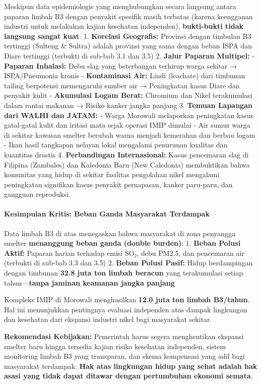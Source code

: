 \documentclass[
]{article}
\begin{document}
Meskipun data epidemiologis yang menghubungkan secara langsung antara
paparan limbah B3 dengan penyakit spesifik masih terbatas (karena
keengganan industri untuk melakukan kajian kesehatan independen),
\textbf{bukti-bukti tidak langsung sangat kuat}: 1. \textbf{Korelasi
Geografis:} Provinsi dengan timbulan B3 tertinggi (Sulteng \& Sultra)
adalah provinsi yang sama dengan beban ISPA dan Diare tertinggi
(terbukti di sub-bab 3.1 dan 3.5) 2. \textbf{Jalur Paparan Multipel:} -
\textbf{Paparan Inhalasi:} Debu slag yang beterbangan terhirup warga
sekitar → ISPA/Pneumonia kronis - \textbf{Kontaminasi Air:} Lindi
(leachate) dari timbunan tailing berpotensi memengaruhi sumber air →
Peningkatan kasus Diare dan penyakit kulit - \textbf{Akumulasi Logam
Berat:} Chromium dan Nikel terakumulasi dalam rantai makanan → Risiko
kanker jangka panjang 3. \textbf{Temuan Lapangan dari WALHI dan JATAM:}
- Warga Morowali melaporkan peningkatan kasus gatal-gatal kulit dan
iritasi mata sejak operasi IMIP dimulai - Air sumur warga di sekitar
kawasan smelter berubah warna menjadi kemerahan dan berbau logam - Ikan
hasil tangkapan nelayan lokal mengalami penurunan kualitas dan kuantitas
drastis 4. \textbf{Perbandingan Internasional:} Kasus pencemaran slag di
Filipina (Zambales) dan Kaledonia Baru (New Caledonia) membuktikan bahwa
komunitas yang hidup di sekitar fasilitas pengolahan nikel mengalami
peningkatan signifikan kasus penyakit pernapasan, kanker paru-paru, dan
gangguan reproduksi.

\paragraph{Kesimpulan Kritis: Beban Ganda Masyarakat
Terdampak}\label{kesimpulan-kritis-beban-ganda-masyarakat-terdampak}

Data limbah B3 di atas menegaskan bahwa masyarakat di zona penyangga
smelter \textbf{menanggung beban ganda (double burden)}: 1.
\textbf{Beban Polusi Aktif:} Paparan harian terhadap emisi SO₂, debu
PM2.5, dan pencemaran air (terbukti di sub-bab 3.3 dan 3.5) 2.
\textbf{Beban Polusi Pasif:} Hidup berdampingan dengan timbunan
\textbf{32.8 juta ton limbah beracun} yang terakumulasi setiap
tahun---\textbf{tanpa jaminan keamanan jangka panjang}

Kompleks IMIP di Morowali menghasilkan \textbf{12.0 juta ton limbah
B3/tahun}. Hal ini menunjukkan pentingnya evaluasi independen atas
dampak lingkungan dan kesehatan dari ekspansi industri nikel bagi
masyarakat sekitar.

\textbf{Rekomendasi Kebijakan:} Pemerintah harus segera menghentikan
ekspansi smelter baru hingga tersedia kajian risiko kesehatan
independen, sistem monitoring limbah B3 yang transparan, dan skema
kompensasi yang adil bagi masyarakat terdampak. \textbf{Hak atas
lingkungan hidup yang sehat adalah hak asasi yang tidak dapat ditawar
dengan pertumbuhan ekonomi semata}.
\end{document}
